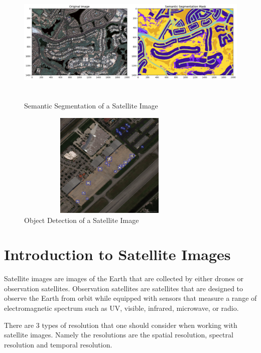 \begin{figure}[ht]
\includegraphics[width=12cm, height=6cm]{images/semantic segmentation example.jpg}
\centering
\caption{Semantic Segmentation of a Satellite Image}
\label{fig:example of semantic segmentation}
\end{figure}

\begin{figure}[ht]
\includegraphics[width=9cm, height=5cm]{images/airport object detection.jpeg}
\centering
\caption{Object Detection of a Satellite Image}
\label{fig:airport object detection}
\end{figure}

\section{Introduction to Satellite Images}

Satellite images are images of the Earth that are collected by either drones or observation satellites. Observation satellites are satellites that are designed to observe the Earth from orbit while equipped with sensors that measure a range of  electromagnetic spectrum such as UV, visible, infrared, microwave, or radio. 

There are 3 types of resolution that one should consider when working with satellite images. Namely the resolutions are the spatial resolution, spectral resolution and temporal resolution.

